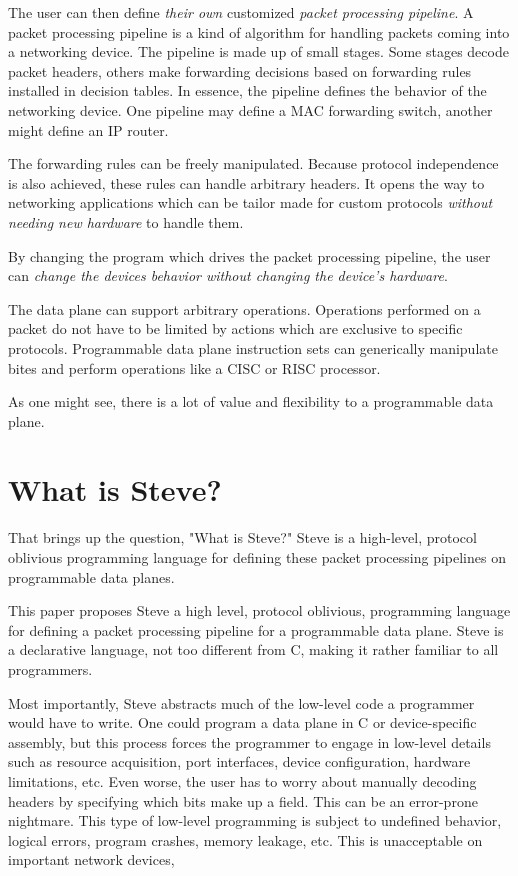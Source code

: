 The user can then define \textit{their own} customized \textit{packet processing pipeline}. A packet processing pipeline is a kind of algorithm for handling packets coming into a networking device. The pipeline is made up of small stages. Some stages decode packet headers, others make forwarding decisions based on forwarding rules installed in decision tables. In essence, the pipeline defines the behavior of the networking device. One pipeline may define a MAC forwarding switch, another might define an IP router.

The forwarding rules can be freely manipulated. Because protocol independence is also achieved, these rules can handle arbitrary headers. It opens the way to networking applications which can be tailor made for custom protocols \textit{without needing new hardware} to handle them.

By changing the program which drives the packet processing pipeline, the user can \textit{change the devices behavior without changing the device's hardware}.

The data plane can support arbitrary operations. Operations performed on a packet do not have to be limited by actions which are exclusive to specific protocols. Programmable data plane instruction sets can generically manipulate bites and perform operations like a CISC or RISC processor.

As one might see, there is a lot of value and flexibility to a programmable data plane. 

\section{What is Steve?}

That brings up the question, "What is Steve?" Steve is a high-level, protocol oblivious programming language for defining these packet processing pipelines on programmable data planes.

This paper proposes Steve a high level, protocol oblivious, programming language for defining a packet processing pipeline for a programmable data plane. Steve is a declarative language, not too different from C, making it rather familiar to all programmers.

Most importantly, Steve abstracts much of the low-level code a programmer would have to write. One could program a data plane in C or device-specific assembly, but this process forces the programmer to engage in low-level details such as resource acquisition, port interfaces, device configuration, hardware limitations, etc. Even worse, the user has to worry about manually decoding headers by specifying which bits make up a field. This can be an error-prone nightmare. This type of low-level programming is subject to undefined behavior, logical errors, program crashes, memory leakage, etc. This is unacceptable on important network devices,

